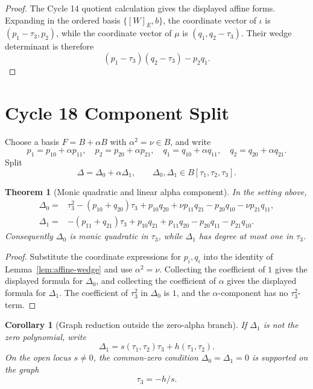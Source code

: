 \documentclass[11pt]{article}
\newtheorem{theorem}{Theorem}
\newtheorem{corollary}{Corollary}
\newcommand{\Deltaone}{\Delta_1}
\newcommand{\Deltazero}{\Delta_0}
\newcommand{\tauone}{\tau_1}
\newcommand{\tautwo}{\tau_2}
\newcommand{\tauthree}{\tau_3}
\begin{document}
\begin{proof}
The Cycle 14 quotient calculation gives the displayed affine forms.  Expanding
in the ordered basis \(\{[W]_E,b\}\), the coordinate vector of \(\iota\) is
\((p_1-\tauthree,p_2)\), while the coordinate vector of \(\mu\) is
\((q_1,q_2-\tauthree)\).  Their wedge determinant is therefore
\[
  (p_1-\tauthree)(q_2-\tauthree)-p_2q_1.
\]
\end{proof}

\section{Cycle 18 Component Split}

Choose a basis \(F=B+\alpha B\) with \(\alpha^2=\nu\in B\), and write
\[
  p_1=p_{10}+\alpha p_{11},\quad
  p_2=p_{20}+\alpha p_{21},\quad
  q_1=q_{10}+\alpha q_{11},\quad
  q_2=q_{20}+\alpha q_{21}.
\]
Split
\[
  \Delta=\Deltazero+\alpha\Deltaone,\qquad
  \Deltazero,\Deltaone\in B[\tauone,\tautwo,\tauthree].
\]

\begin{theorem}[Monic quadratic and linear alpha component]
\label{thm:component-split}
In the setting above,
\[
\begin{aligned}
\Deltazero={}&
  \tauthree^2-(p_{10}+q_{20})\tauthree
  +p_{10}q_{20}+\nu p_{11}q_{21}
  -p_{20}q_{10}-\nu p_{21}q_{11},\\
\Deltaone={}&
  -(p_{11}+q_{21})\tauthree
  +p_{10}q_{21}+p_{11}q_{20}-p_{20}q_{11}-p_{21}q_{10}.
\end{aligned}
\]
Consequently \(\Deltazero\) is monic quadratic in \(\tauthree\), while
\(\Deltaone\) has degree at most one in \(\tauthree\).
\end{theorem}

\begin{proof}
Substitute the coordinate expressions for \(p_i,q_i\) into the identity of
Lemma~\ref{lem:affine-wedge} and use \(\alpha^2=\nu\).  Collecting the
coefficient of \(1\) gives the displayed formula for \(\Deltazero\), and
collecting the coefficient of \(\alpha\) gives the displayed formula for
\(\Deltaone\).  The coefficient of \(\tauthree^2\) in \(\Deltazero\) is \(1\),
and the \(\alpha\)-component has no \(\tauthree^2\)-term.
\end{proof}

\begin{corollary}[Graph reduction outside the zero-alpha branch]
\label{cor:graph}
If \(\Deltaone\) is not the zero polynomial, write
\[
  \Deltaone=s(\tauone,\tautwo)\tauthree+h(\tauone,\tautwo).
\]
On the open locus \(s\ne0\), the common-zero condition
\(\Deltazero=\Deltaone=0\) is supported on the graph
\[
  \tauthree=-h/s.
\]
\end{corollary}
\end{document}
